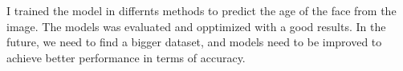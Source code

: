 \begin{Conclusion}
I trained the model in differnts methods to predict the age of the face from the image. 
The models was evaluated and opptimized with a good results. In the future, we need to find a bigger dataset, and models need to be improved to achieve better performance in terms of accuracy.


\end{Conclusion}